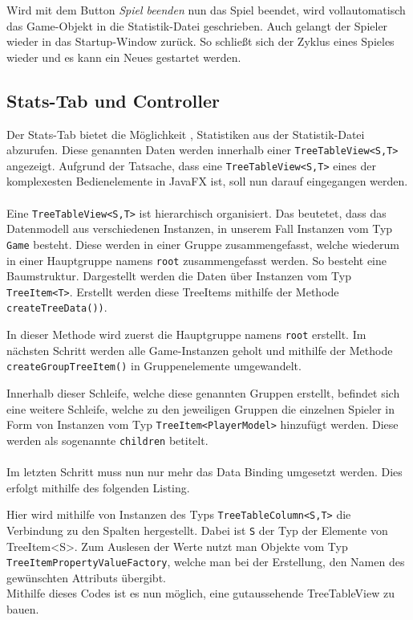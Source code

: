 Wird mit dem Button \textit{Spiel beenden} nun das Spiel beendet, wird vollautomatisch das Game-Objekt in die Statistik-Datei geschrieben.
Auch gelangt der Spieler wieder in das Startup-Window zurück.
So schließt sich der Zyklus eines Spieles wieder und es kann ein Neues gestartet werden.
\subsection{Stats-Tab und Controller}\label{sssec:statsController}
Der Stats-Tab bietet die Möglichkeit , Statistiken aus der Statistik-Datei abzurufen.
Diese genannten Daten werden innerhalb einer \lstinline[style=java]{TreeTableView<S,T>} angezeigt.
Aufgrund der Tatsache, dass eine \lstinline[style=java]{TreeTableView<S,T>} eines der komplexesten Bedienelemente in JavaFX ist, soll nun darauf eingegangen werden.\\\\
Eine \lstinline[style=java]{TreeTableView<S,T>} ist hierarchisch organisiert.
Das beutetet, dass das Datenmodell aus verschiedenen Instanzen, in unserem Fall Instanzen vom Typ \lstinline[style=java]{Game} besteht.
Diese werden in einer Gruppe zusammengefasst, welche wiederum in einer Hauptgruppe namens \lstinline[style=java]{root} zusammengefasst werden.
So besteht eine Baumstruktur.
Dargestellt werden die Daten über Instanzen vom Typ \lstinline[style=java]{TreeItem<T>}.
Erstellt werden diese TreeItems mithilfe der Methode \lstinline[style=java]{createTreeData())}.

In dieser Methode wird zuerst die Hauptgruppe namens \lstinline[style=java]{root} erstellt.
Im nächsten Schritt werden alle Game-Instanzen geholt und mithilfe der Methode \lstinline[style=java]{createGroupTreeItem()} in Gruppenelemente umgewandelt.

Innerhalb dieser Schleife, welche diese genannten Gruppen erstellt, befindet sich eine weitere Schleife, welche zu den jeweiligen Gruppen die einzelnen Spieler in Form von Instanzen vom Typ \lstinline[style=java]{TreeItem<PlayerModel>} hinzufügt werden.
Diese werden als sogenannte \lstinline[style=java]{children} betitelt.\\\\
Im letzten Schritt muss nun nur mehr das Data Binding umgesetzt werden.
Dies erfolgt mithilfe des folgenden Listing.

Hier wird mithilfe von Instanzen des Typs \lstinline[style=java]{TreeTableColumn<S,T>} die Verbindung zu den Spalten hergestellt.
Dabei ist \lstinline[style=java]{S} der Typ der Elemente von {TreeItem<S>}.
Zum Auslesen der Werte nutzt man Objekte vom Typ \lstinline[style=java]{TreeItemPropertyValueFactory}, welche man bei der Erstellung, den Namen des gewünschten Attributs übergibt.\\
Mithilfe dieses Codes ist es nun möglich, eine gutaussehende TreeTableView zu bauen.
